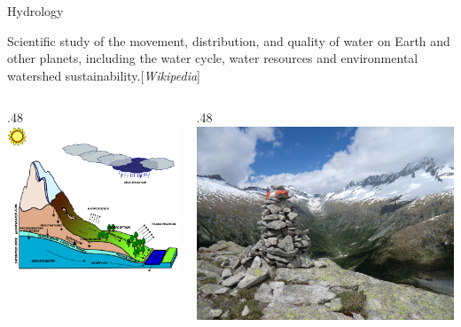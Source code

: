 \documentclass[ignorenonframetext,]{beamer}
\def\begincols{\begin{columns}}
\def\begincol{\begin{column}}
\def\endcol{\end{column}}
\def\endcols{\end{columns}}
\begin{document}
\begin{frame}{Hydrology}

Scientific study of the movement, distribution, and quality of water on
Earth and other planets, including the water cycle, water resources and
environmental watershed sustainability.{[}\emph{Wikipedia}{]} \begincols
\begincol{.48\textwidth}
\includegraphics[width=1.00000\textwidth]{resources/images/geotop_landscape.png}\\
\endcol
\begincol{.48\textwidth}
\includegraphics[width=1.00000\textwidth]{resources/images/valdifumo.jpg}\\
\endcol
\endcols

\end{frame}
\end{document}
